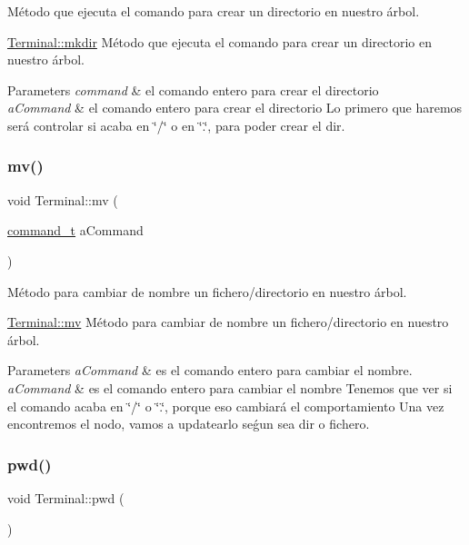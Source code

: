 Método que ejecuta el comando para crear un directorio en nuestro árbol. 

\hyperlink{classTerminal_accc2ad8c2abcfc1a01fafb6ad9e3c7ea}{Terminal\+::mkdir} Método que ejecuta el comando para crear un directorio en nuestro árbol.


\begin{DoxyParams}{Parameters}
{\em command} & el comando entero para crear el directorio\\
\hline
{\em a\+Command} & el comando entero para crear el directorio Lo primero que haremos será controlar si acaba en \char`\"{}/\char`\"{} o en \char`\"{}.\char`\"{}, para poder crear el dir. \\
\hline
\end{DoxyParams}
\mbox{\label{classTerminal_ae71eae23c6e320c30e8f4dd44f59201a}} 
\subsubsection{\texorpdfstring{mv()}{mv()}}
{\footnotesize\ttfamily void Terminal\+::mv (\begin{DoxyParamCaption}\item[{\hyperlink{structcommand__t}{command\+\_\+t}}]{a\+Command }\end{DoxyParamCaption})}



Método para cambiar de nombre un fichero/directorio en nuestro árbol. 

\hyperlink{classTerminal_ae71eae23c6e320c30e8f4dd44f59201a}{Terminal\+::mv} Método para cambiar de nombre un fichero/directorio en nuestro árbol.


\begin{DoxyParams}{Parameters}
{\em a\+Command} & es el comando entero para cambiar el nombre.\\
\hline
{\em a\+Command} & es el comando entero para cambiar el nombre Tenemos que ver si el comando acaba en \char`\"{}/\char`\"{} o \char`\"{}.\char`\"{}, porque eso cambiará el comportamiento Una vez encontremos el nodo, vamos a updatearlo seǵun sea dir o fichero. \\
\hline
\end{DoxyParams}
\mbox{\label{classTerminal_a5e3706157c23216bcde9a7b68a2f0663}} 
\subsubsection{\texorpdfstring{pwd()}{pwd()}}
{\footnotesize\ttfamily void Terminal\+::pwd (\begin{DoxyParamCaption}{ }\end{DoxyParamCaption})}



